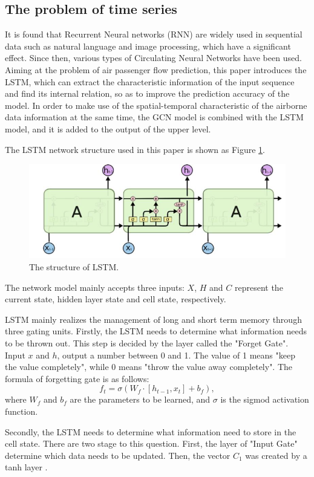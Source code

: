 \documentclass[journal,article,submit,moreauthors,pdftex]{Definitions/mdpi}
\begin{document}
\subsection{The problem of time series}
It is found that Recurrent Neural networks (RNN) are widely used in sequential data such as natural language and image processing, which have a significant effect. Since then, various types of Circulating Neural Networks have been used. Aiming at the problem of air passenger flow prediction, this paper introduces the LSTM, which can extract the characteristic information of the input sequence and find its internal relation, so as to improve the prediction accuracy of the model. In order to make use of the  spatial-temporal characteristic of the airborne data information at the same time, the GCN model is combined with the LSTM model, and it is added to the output of the upper level.
\par The LSTM network structure used in this paper is shown as Figure \ref{fig:lstm}.
\begin{figure}
    \centering
    \includegraphics[width=8 cm]{./imgs/LSTMpng.png}
    \caption{The structure of LSTM.}
    \label{fig:lstm}
\end{figure}
\par The network model mainly accepts three inputs: $X$, $H$ and $C$ represent the current state, hidden layer state and cell state, respectively.
\par LSTM mainly realizes the management of long and short term memory through three gating units. 
Firstly, the LSTM needs to determine what information needs to be thrown out. 
This step is decided by the layer called the "Forget Gate". Input $x$ and $h$, output a number between 0 and 1. The value of 1 means "keep the value completely", while 0 means "throw the value away completely". The formula of forgetting gate is as follows:
\begin{equation}
    f_{t}=\sigma\left(W_{f} \cdot\left[h_{t-1}, x_{t}\right]+b_{f}\right),
\end{equation}
where $W_{f}$ and $b_{f}$ are the parameters to be learned, and $\sigma$ is the sigmod activation function.
\par Secondly, the LSTM needs to determine what information need to store in the cell state. There are two stage to this question. First, the layer of "Input Gate" determine which data needs to be updated. Then, the vector $C_{1}$ was created by a tanh layer .
\end{document}
